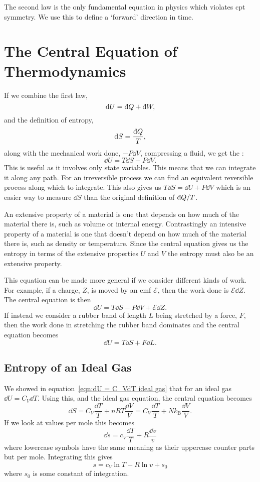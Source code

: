 \documentclass[a4paper]{article}
\newcommand{\boltzmann}{k_\mathrm{B}}
\newcommand{\ddbar}[1]{\text{\dj}{#1}}
\newcommand{\emf}{\mathcal{E}}
\begin{document}
    The second law is the only fundamental equation in physics which violates \gls{cpt} symmetry.
    We use this to define a `forward' direction in time.
    
    \section{The Central Equation of Thermodynamics}
    If we combine the first law,
    \[\dd{U} = \ddbar{Q} + \ddbar{W},\]
    and the definition of entropy,
    \[\dd{S} = \frac{\ddbar{Q}}{T},\]
    along with the mechanical work done, \(-P\dd{V}\), compressing a fluid, we get the :
    \[\dd{U} = T\dd{S} - P\dd{V}.\]
    This is useful as it involves only state variables.
    This means that we can integrate it along any path.
    For an irreversible process we can find an equivalent reversible process along which to integrate.
    This also gives us \(T\dd{S} = \dd{U} + P\dd{V}\) which is an easier way to measure \(\dd{S}\) than the original definition of \(\ddbar{Q}/T\).
    
    An extensive property of a material is one that depends on how much of the material there is, such as volume or internal energy.
    Contrastingly an intensive property of a material is one that doesn't depend on how much of the material there is, such as density or temperature.
    Since the central equation gives us the entropy in terms of the extensive properties \(U\) and \(V\) the entropy must also be an extensive property.
    
    This equation can be made more general if we consider different kinds of work.
    For example, if a charge, \(Z\), is moved by an emf \(\emf\), then the work done is \(\emf\dd{Z}\).
    The central equation is then
    \[\dd{U} = T\dd{S} - P\dd{V} + \emf\dd{Z}.\]
    If instead we consider a rubber band of length \(L\) being stretched by a force, \(F\), then the work done in stretching the rubber band dominates and the central equation becomes
    \[\dd{U} = T\dd{S} + F\dd{L}.\]
    
    \subsection{Entropy of an Ideal Gas}
    We showed in equation~\ref{eqn:dU = C_VdT ideal gas} that for an ideal gas \(\dd{U} = C_V\dd{T}\).
    Using this, and the ideal gas equation, the central equation becomes
    \[\dd{S} = C_V\frac{\dd{T}}{T} + nRT\frac{\dd{V}}{V} = C_V\frac{\dd{T}}{T} + N\boltzmann\frac{\dd{V}}{V}.\]
    If we look at values per mole this becomes
    \[\dd{s} = c_V\frac{\dd{T}}{T} + R\frac{\dd{v}}{v}\]
    where lowercase symbols have the same meaning as their uppercase counter parts but per mole.
    Integrating this gives
    \[s = c_V\ln T + R\ln v + s_0\]
    where \(s_0\) is some constant of integration.
    
\end{document}
